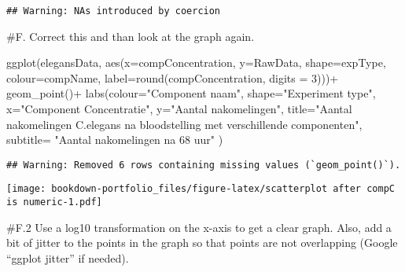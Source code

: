 \documentclass[
]{book}
\newenvironment{Shaded}{\begin{snugshade}}{\end{snugshade}}
\newcommand{\AttributeTok}[1]{\textcolor[rgb]{0.77,0.63,0.00}{#1}}
\newcommand{\DecValTok}[1]{\textcolor[rgb]{0.00,0.00,0.81}{#1}}
\newcommand{\FunctionTok}[1]{\textcolor[rgb]{0.00,0.00,0.00}{#1}}
\newcommand{\NormalTok}[1]{#1}
\newcommand{\SpecialCharTok}[1]{\textcolor[rgb]{0.00,0.00,0.00}{#1}}
\newcommand{\StringTok}[1]{\textcolor[rgb]{0.31,0.60,0.02}{#1}}
\begin{document}
\begin{verbatim}
## Warning: NAs introduced by coercion
\end{verbatim}

\#F. Correct this and than look at the graph again.

\begin{Shaded}
\begin{Highlighting}[]
  \FunctionTok{ggplot}\NormalTok{(elegansData, }\FunctionTok{aes}\NormalTok{(}\AttributeTok{x=}\NormalTok{compConcentration, }\AttributeTok{y=}\NormalTok{RawData, }\AttributeTok{shape=}\NormalTok{expType, }\AttributeTok{colour=}\NormalTok{compName, }\AttributeTok{label=}\FunctionTok{round}\NormalTok{(compConcentration, }\AttributeTok{digits =} \DecValTok{3}\NormalTok{)))}\SpecialCharTok{+}
  \FunctionTok{geom\_point}\NormalTok{()}\SpecialCharTok{+}
  \FunctionTok{labs}\NormalTok{(}\AttributeTok{colour=}\StringTok{"Component naam"}\NormalTok{, }\AttributeTok{shape=}\StringTok{"Experiment type"}\NormalTok{,}
       \AttributeTok{x=}\StringTok{"Component Concentratie"}\NormalTok{,}
       \AttributeTok{y=}\StringTok{"Aantal nakomelingen"}\NormalTok{,}
       \AttributeTok{title=}\StringTok{"Aantal nakomelingen C.elegans na bloodstelling met verschillende componenten"}\NormalTok{,}
       \AttributeTok{subtitle=} \StringTok{"Aantal nakomelingen na 68 uur"}
\NormalTok{)}
\end{Highlighting}
\end{Shaded}

\begin{verbatim}
## Warning: Removed 6 rows containing missing values (`geom_point()`).
\end{verbatim}

\texttt{[image: bookdown-portfolio\_files/figure-latex/scatterplot after compC is numeric-1.pdf]}

\#F.2 Use a log10 transformation on the x-axis to get a clear graph. Also, add a bit of jitter to the points in the graph so that points are not overlapping (Google ``ggplot jitter'' if needed).
\end{document}
